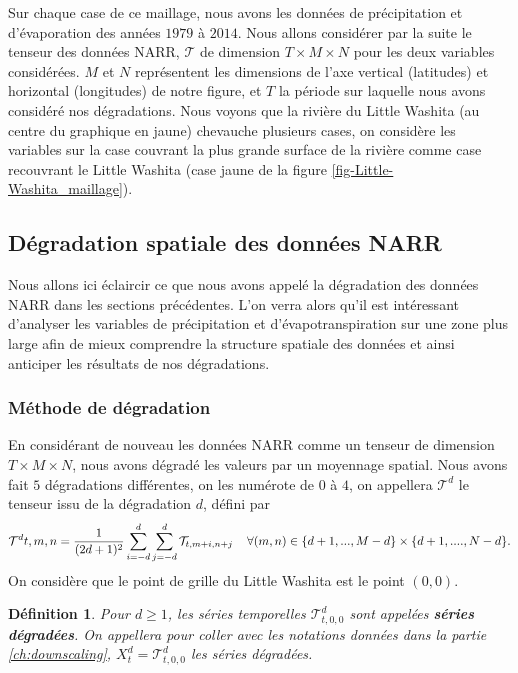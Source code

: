 \documentclass[a4paper,11pt]{article}
\numberwithin{equation}{section}
\newtheorem{definition}{Définition}
\begin{document}
Sur chaque case de ce maillage, nous avons les données de précipitation et d'évaporation des années $1979$ à $2014$. Nous allons considérer par la suite le tenseur des données NARR, $\mathcal{T}$ de dimension $T \times M\times N$ pour les deux variables considérées. $M$ et $N$ représentent les dimensions de l'axe vertical (latitudes) et horizontal (longitudes) de notre figure, et $T$ la période sur laquelle nous avons considéré nos dégradations. Nous voyons que la rivière du Little Washita (au centre du graphique en jaune) chevauche plusieurs cases, on considère les variables sur la case couvrant la plus grande surface de la rivière comme case recouvrant le Little Washita (case jaune de la figure \ref{fig-Little-Washita_maillage}).

\subsection{Dégradation spatiale des données NARR}
\label{ch:degradation-NARR}
Nous allons ici éclaircir ce que nous avons appelé la dégradation des données NARR dans les sections précédentes. L'on verra alors qu'il est intéressant d'analyser les variables de précipitation et d'évapotranspiration sur une zone plus large afin de mieux comprendre la structure spatiale des données et ainsi anticiper les résultats de nos dégradations. 

\subsubsection{Méthode de dégradation}

En considérant de nouveau les données NARR comme un tenseur de dimension $T\times M \times N$,
nous avons dégradé les valeurs par un moyennage spatial. Nous avons fait $5$ dégradations différentes, on les numérote de $0$ à $4$, on appellera $\mathcal{T}^{d}$ le tenseur issu de la dégradation $d$, défini par
\begin{equation}
	\label{eq-degradation}
	\mathcal{T}^{d}{t,m,n}=\frac{1}{(2d+1)^2} \sum_{i=-d}^{d}\sum_{j=-d}^{d}\mathcal{T}_{t,m+i,n+j} \hspace{4mm} \forall (m,n) \in \{d+1,...,M-d\}\times\{d+1,...., N-d\}.
\end{equation}
On considère que le point de grille du Little Washita est le point $(0,0)$. 
\begin{definition}
	\label{serie-deg}
	Pour $d\geq1$, les séries temporelles $\mathcal{T}^{d}_{t,0,0}$ sont appelées \textbf{séries dégradées}. On appellera pour coller avec les notations données dans la partie \ref{ch:downscaling}, $X^d_t=\mathcal{T}^{d}_{t,0,0}$ les séries dégradées.
\end{definition}
\end{document}

